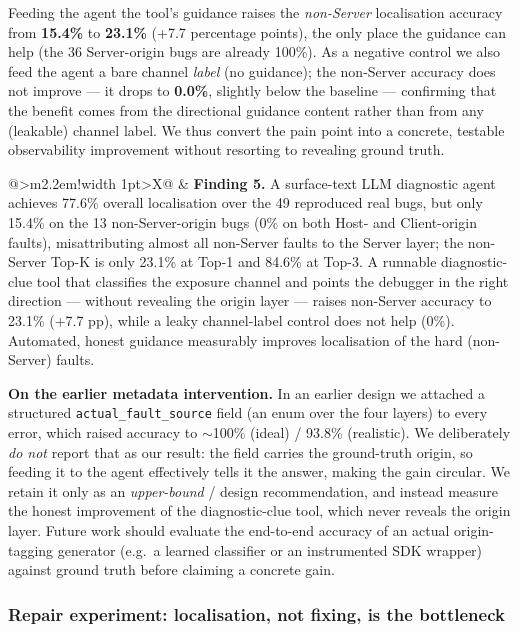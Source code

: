 Feeding the agent the tool's guidance raises the \emph{non-Server} localisation accuracy from
\textbf{15.4\%} to \textbf{23.1\%} (+7.7 percentage points), the only place the guidance can help
(the 36 Server-origin bugs are already 100\%). As a negative control we also feed the agent a
bare channel \emph{label} (no guidance); the non-Server accuracy does not improve --- it drops to
\textbf{0.0\%}, slightly below the baseline --- confirming that the benefit comes from the
directional guidance content rather than from any (leakable) channel label. We thus convert the
pain point into a concrete, testable observability improvement without resorting to revealing
ground truth.

\noindent
\begin{tabularx}{\linewidth}{@{}>{\centering\arraybackslash}m{2.2em}!{\vrule width 1pt}>{\arraybackslash}X@{}}
 &
\textbf{Finding 5.} A surface-text LLM diagnostic agent achieves 77.6\% overall localisation over the 49 reproduced real bugs, but only 15.4\% on the 13 non-Server-origin bugs (0\% on both Host- and Client-origin faults), misattributing almost all non-Server faults to the Server layer; the non-Server Top-K is only 23.1\% at Top-1 and 84.6\% at Top-3. A runnable diagnostic-clue tool that classifies the exposure channel and points the debugger in the right direction --- without revealing the origin layer --- raises non-Server accuracy to 23.1\% (+7.7 pp), while a leaky channel-label control does not help (0\%). Automated, honest guidance measurably improves localisation of the hard (non-Server) faults.
\end{tabularx}

\textbf{On the earlier metadata intervention.} In an earlier design we attached a structured
\texttt{actual\_fault\_source} field (an enum over the four layers) to every error, which raised
accuracy to $\sim$100\% (ideal) / 93.8\% (realistic). We deliberately \emph{do not} report that
as our result: the field carries the ground-truth origin, so feeding it to the agent effectively
tells it the answer, making the gain circular. We retain it only as an \emph{upper-bound} /
design recommendation, and instead measure the honest improvement of the diagnostic-clue tool,
which never reveals the origin layer. Future work should evaluate the end-to-end accuracy of an
actual origin-tagging generator (e.g.\ a learned classifier or an instrumented SDK wrapper)
against ground truth before claiming a concrete gain.

\subsubsection{Repair experiment: localisation, not fixing, is the bottleneck}

